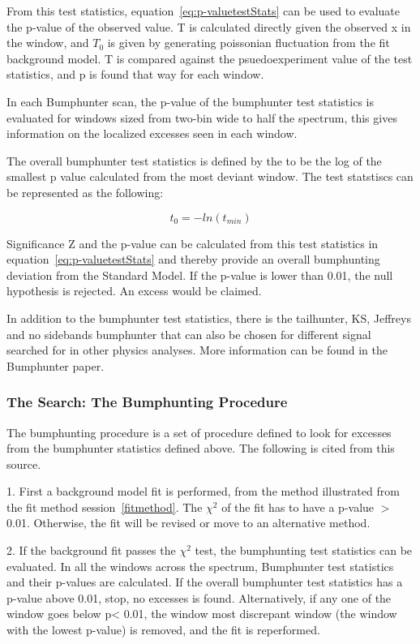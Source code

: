     From this test statistics, equation~\ref{eq:p-valuetestStats} can be used to evaluate the p-value of the observed value. T is calculated directly given the observed x in the window, and $T_{0}$ is given by generating poissonian fluctuation from the fit background model. T is compared against the psuedoexperiment value of the test statistics, and p is found that way for each window. 

    In each Bumphunter scan, the p-value of the bumphunter test statistics is evaluated for windows sized from two-bin wide to half the spectrum, this gives information on the localized excesses seen in each window.

    The overall bumphunter test statistics is defined by the to be the log of the smallest p value calculated from the most deviant window. The test statstiscs can be represented as the following:

    \begin{equation}
        t_{0} = - ln (t_{min}) 
    \end{equation}

    Significance Z and the p-value can be calculated from this test statistics in equation~\ref{eq:p-valuetestStats} and thereby provide an overall bumphunting deviation from the Standard Model. If the p-value is lower than 0.01, the null hypothesis is rejected. An excess would be claimed. 

    In addition to the bumphunter test statistics, there is the tailhunter, KS, Jeffreys and no sidebands bumphunter that can also be chosen for different signal searched for in other physics analyses. More information can be found in the Bumphunter paper\cite{choudalakis2011hypothesis}.

    \subsubsection{The Search: The Bumphunting Procedure}
    The bumphunting procedure is a set of procedure defined to look for excesses from the bumphunter statistics defined above. The following is cited from this source\cite{Pachal:206032}.

    1.  First a background model fit is performed, from the method illustrated from the fit method session~\ref{fitmethod}. The $\chi^{2}$ of the fit has to have a p-value $>$ 0.01. Otherwise, the fit will be revised or move to an alternative method.

    2.  If the background fit passes the $\chi^{2}$ test, the bumphunting test statistics can be evaluated. In all the windows across the spectrum, Bumphunter test statistics and their p-values are calculated. If the overall bumphunter test statistics has a p-value above 0.01, stop, no excesses is found. Alternatively, if any one of the window goes below p< 0.01, the window most discrepant window (the window with the lowest p-value) is removed, and the fit is reperformed.

